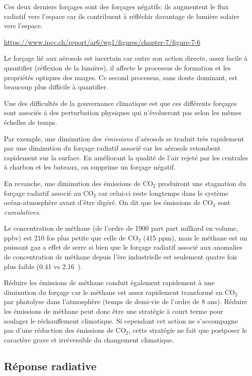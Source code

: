 Ces deux derniers forçages sont des forçages négatifs: ils augmentent le flux radiatif vers l'espace car ils contribuent à réfléchir davantage de lumière solaire vers l'espace. 

\url{https://www.ipcc.ch/report/ar6/wg1/figures/chapter-7/figure-7-6}

Le forçage lié aux aérosols est incertain car outre son action directe, assez facile à quantifier (réflexion de la lumière), il affecte le processus de formation et les propriétés optiques des nuages. Ce second processus, sans doute dominant, est beaucoup plus difficile à quantifier. 

Une des difficultés de la gouvernance climatique est que ces différents forçages sont associés à des perturbation physiques qui n'évolueront pas selon les mêmes échelles de temps. 

Par exemple, une diminution des \emph{émissions} d'aérosols se traduit très rapidement par une diminution du forçage radiatif associé car les aérosols retombent rapidement sur la surface. En améliorant la qualité de l'air rejeté par les centrales à charbon et les bateaux, on supprime un forçage négatif. 


En revanche, une diminution des émissions de CO$_2$ produiront une stagnation du forçage radiatif associé au CO$_2$ car celui-ci reste longtemps dans le système océan-atmosphère avant d'être digéré. On dit que les émissions de CO$_2$ sont \emph{cumulatives}. 

Le concentration de méthane (de l'ordre de 1900 part part milliard en volume, ppbv) est 210 fos plus petite que celle de CO$_2$ (415 ppm), mais le méthane est un puissant gaz a effet de serre si bien que le forçage radiatif associé aux anomalies de concentration de méthane depuis l'ère industrielle est seulement quatre fois plus faible (0.41 vs 2.16\ \wmm). 

Réduire les émissions de méthane conduit également rapidement à une diminution du forçage car le méthane est assez rapidement transformé en CO$_2$ par photolyse dans l'atmosphère (temps de demi-vie de l'ordre de 8 ans). Réduire les émissions de méthane peut donc être une stratégie à court terme pour soulager le réchauffement climatique. Si cependant cet action ne s'accompagne pas d'une réduction des émissions de CO$_2$, cette stratégie ne fait que postposer le caractère grave et irréversible du changement climatique. 

\subsection{Réponse radiative}

